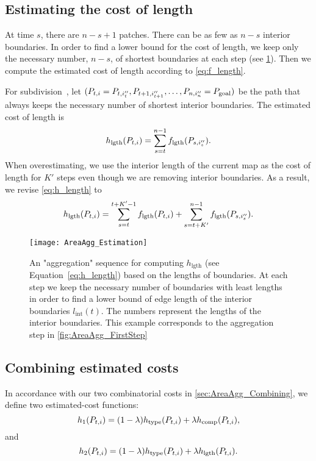 \subsection{Estimating the cost of length}
\label{sec:AreaAgg_h_length}

At time $s$, there are $n-s+1$ patches.
There can be as few as $n-s$ interior boundaries.
In order to find a lower bound for the cost of length,
we keep only the necessary number, $n-s$, 
of shortest boundaries at each step
(see \fig\ref{fig:AreaAgg_h_length}).
Then we compute the estimated cost of length according to 
\eq\ref{eq:f_length}.

For subdivision~\Pnode, let
$(P_{t,i}=P_{t,i''_t}, P_{t+1,i''_{t+1}}, \dots,P_{n,i''_n}=P_\mathrm{goal})$
be the path that always keeps 
the necessary number of shortest interior boundaries.
The estimated cost of length is
\begin{equation}
\label{eq:h_length}
h_\mathrm{lgth}(P_{t,i})=
\sum_{s=t}^{n-1}f_\mathrm{lgth}(P_{s,i''_s}).
\end{equation}
When overestimating,
we use the interior length of the current map as the cost of 
length for $K'$ steps even though we are removing 
interior boundaries.
As a result, we revise \fo\ref{eq:h_length} to
\begin{equation}
\label{eq:o_length}
h_\mathrm{lgth}(P_{t,i})=
\sum_{s=t}^{t+K'-1}f_\mathrm{lgth}(P_{t,i})+
\sum_{s=t+K'}^{n-1}f_\mathrm{lgth}(P_{s,i''_s}). \nonumber
\end{equation}


\begin{figure*}[htb]
\centering
\texttt{[image: AreaAgg\_Estimation]}
\caption{An "aggregation" sequence for computing 
	$h_\mathrm{lgth}$ 
	(see Equation~\ref{eq:h_length}) 
	based on the lengths of boundaries. 
	At each step we keep the necessary number 
	of boundaries with least lengths in order to find a 
	lower bound of edge length of the interior boundaries 
	$l_\mathrm{int}(t)$. 
	The numbers represent the 
	lengths of the interior boundaries.
	This example corresponds to the aggregation step in 
	\fig\ref{fig:AreaAgg_FirstStep}
}
\label{fig:AreaAgg_h_length}
\end{figure*}


\subsection{Combining estimated costs}
\label{sec:AreaAgg_CombinationEstimated}
In accordance 
with our two combinatorial costs in 
\sect\ref{sec:AreaAgg_Combining},
we define two estimated-cost functions:
\begin{equation}
\label{eq:h_1}
h_1(P_{t,i})=
(1-\lambda)h_\mathrm{type}(P_{t,i})
+\lambda h_{\mathrm{comp}}(P_{t,i}), \nonumber
\end{equation}
and
\begin{equation}
\label{eq:h_2}
h_2(P_{t,i})=
(1-\lambda)h_\mathrm{type}(P_{t,i})
+\lambda h_{\mathrm{lgth}}(P_{t,i}). \nonumber
\end{equation}



